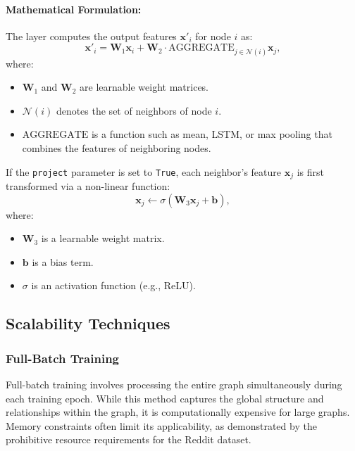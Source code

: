 \documentclass{article}
\begin{document}
\paragraph{Mathematical Formulation:}
The layer computes the output features $\mathbf{x}'_i$ for node $i$ as:
\begin{equation}
\mathbf{x}'_i = \mathbf{W}_1 \mathbf{x}_i + \mathbf{W}_2 \cdot \mathrm{AGGREGATE}_{j \in \mathcal{N}(i)} \mathbf{x}_j,
\end{equation}
where:
\begin{itemize}
    \item $\mathbf{W}_1$ and $\mathbf{W}_2$ are learnable weight matrices.
    \item $\mathcal{N}(i)$ denotes the set of neighbors of node $i$.
    \item $\mathrm{AGGREGATE}$ is a function such as mean, LSTM, or max pooling that combines the features of neighboring nodes.
\end{itemize}

If the \texttt{project} parameter is set to \texttt{True}, each neighbor's feature $\mathbf{x}_j$ is first transformed via a non-linear function:
\begin{equation}
\mathbf{x}_j \leftarrow \sigma ( \mathbf{W}_3 \mathbf{x}_j + \mathbf{b}),
\end{equation}
where:
\begin{itemize}
    \item $\mathbf{W}_3$ is a learnable weight matrix.
    \item $\mathbf{b}$ is a bias term.
    \item $\sigma$ is an activation function (e.g., ReLU).
\end{itemize}

\subsection{Scalability Techniques}

\subsubsection{Full-Batch Training}
Full-batch training involves processing the entire graph simultaneously during each training epoch. While this method captures the global structure and relationships within the graph, it is computationally expensive for large graphs. Memory constraints often limit its applicability, as demonstrated by the prohibitive resource requirements for the Reddit dataset.
\end{document}
